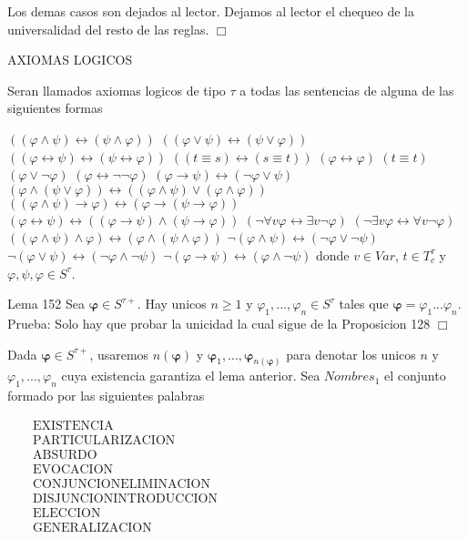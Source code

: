 Los demas casos son dejados al lector.
Dejamos al lector el chequeo de la universalidad del resto de las reglas. \(\Box\)

AXIOMAS LOGICOS

Seran llamados axiomas logicos de tipo \(\tau \) a todas las sentencias de alguna de las siguientes formas

\(((\varphi \wedge \psi )\leftrightarrow (\psi \wedge \varphi ))\)
\(((\varphi \vee \psi )\leftrightarrow (\psi \vee \varphi ))\)
\(((\varphi \leftrightarrow \psi )\leftrightarrow (\psi \leftrightarrow \varphi ))\)
\(((t\equiv s)\leftrightarrow (s\equiv t))\)
\((\varphi \leftrightarrow \varphi )\)
\((t\equiv t)\)
\((\varphi \vee \lnot \varphi )\)
\((\varphi \leftrightarrow \lnot \lnot \varphi )\)
\((\varphi \rightarrow \psi )\leftrightarrow (\lnot \varphi \vee \psi )\)
\((\varphi \wedge (\psi \vee \varphi ))\leftrightarrow ((\varphi \wedge \psi )\vee (\varphi \wedge \varphi ))\)
\(((\varphi \wedge \psi )\rightarrow \varphi )\leftrightarrow (\varphi \rightarrow (\psi \rightarrow \varphi ))\)
\((\varphi \leftrightarrow \psi )\leftrightarrow ((\varphi \rightarrow \psi )\wedge (\psi \rightarrow \varphi ))\)
\((\lnot \forall v\varphi \leftrightarrow \exists v\lnot \varphi )\)
\((\lnot \exists v\varphi \leftrightarrow \forall v\lnot \varphi )\)
\(((\varphi \wedge \psi )\wedge \varphi )\leftrightarrow (\varphi \wedge (\psi \wedge \varphi ))\)
\(\lnot (\varphi \wedge \psi )\leftrightarrow (\lnot \varphi \vee \lnot \psi )\)
\(\lnot (\varphi \vee \psi )\leftrightarrow (\lnot \varphi \wedge \lnot \psi )\)
\(\lnot (\varphi \rightarrow \psi )\leftrightarrow (\varphi \wedge \lnot \psi )\)
donde \(v\in Var\), \(t\in T_{c}^{\tau }\) y \(\varphi ,\psi ,\varphi \in S^{\tau }\).

Lema 152 Sea \(\mathbf{\varphi }\in S^{\tau +}\). Hay unicos \(n\geq 1\) y \(\varphi _{1},...,\varphi _{n}\in S^{\tau }\) tales que \( \mathbf{\varphi }=\varphi _{1}...\varphi _{n}\).
Prueba: Solo hay que probar la unicidad la cual sigue de la Proposicion 128 \(\Box\)

Dada \(\mathbf{\varphi }\in S^{\tau +}\), usaremos \(n(\mathbf{\varphi })\) y \( \mathbf{\varphi }_{1},...,\mathbf{\varphi }_{n(\mathbf{\varphi })}\) para denotar los unicos \(n\) y \(\varphi _{1},...,\varphi _{n}\) cuya existencia garantiza el lema anterior. Sea \(Nombres_{1}\) el conjunto formado por las siguientes palabras

\(\displaystyle \begin{array}{rcl} & & \text{EXISTENCIA} \\ & & \text{PARTICULARIZACION} \\ & & \text{ABSURDO} \\ & & \text{EVOCACION} \\ & & \text{CONJUNCIONELIMINACION} \\ & & \text{DISJUNCIONINTRODUCCION} \\ & & \text{ELECCION} \\ & & \text{GENERALIZACION} \end{array} \)

